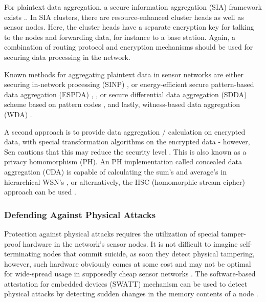 \documentclass[12pt,a4paper,twoside]{report}
\begin{document}
For plaintext data aggregation, a secure information aggregation (SIA) framework exists \cite{sen:2009}.. In SIA clusters, there are resource-enhanced cluster heads as well as sensor nodes. Here, the cluster heads have a separate encryption key for talking to the nodes and forwarding data, for instance to a base station. Again, a combination of routing protocol and encryption mechanisms should be used for securing data processing in the network.\par
Known methods for aggregating plaintext data in sensor networks are either securing in-network processing (SINP) \cite{deng;etal:2003} , or energy-efficient secure pattern-based data aggregation (ESPDA) \cite{cam;etal:2003}, \cite{cam;etal:2005}, or secure differential data aggregation (SDDA) scheme based on pattern codes \cite{cam;etal:2004} , and lastly, witness-based data aggregation (WDA) \cite{du;etal:2003}.\par
A second approach is to provide data aggregation / calculation on encrypted data, with special transformation algorithms on the encrypted data - however, Sen cautions that this may reduce the security level \cite{sen:2009}. This is also known as a privacy homomorphism (PH). An PH implementation called concealed data aggregation (CDA) is capable of calculating the sum's and average's in hierarchical WSN's \cite{girao;etal:2005}, or alternatively, the HSC (homomorphic stream cipher) approach can be used \cite{castelluccia;etal:2005} .\par
\subsubsection{Defending Against Physical Attacks}
Protection against physical attacks requires the utilization of special tamper-proof hardware in the network's sensor nodes. It is not difficult to imagine self-terminating nodes that commit suicide, as soon they detect physical tampering, however, such hardware obviously comes at some cost and may not be optimal for wide-spread usage in supposedly cheap sensor networks \cite{sen:2009}. The software-based attestation for embedded devices (SWATT) mechanism can be used to detect physical attacks by detecting sudden changes in the memory contents of a node \cite{seshadri;etal:2004}.\par
\end{document}
